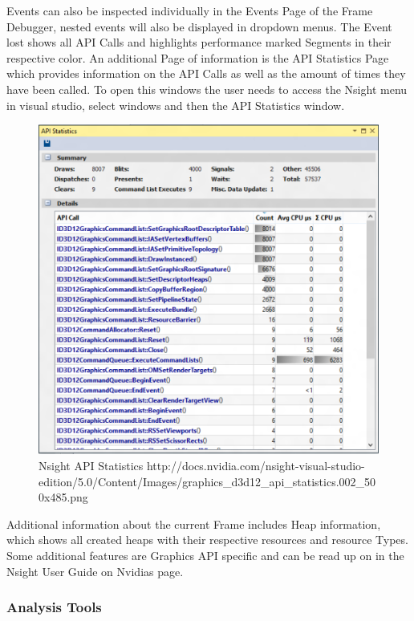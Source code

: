 Events can also be inspected individually in the Events Page of the Frame Debugger, nested events will also be displayed in dropdown menus. The Event lost shows all API Calls and highlights performance marked Segments in their respective color.
An additional Page of information is the API Statistics Page which provides information on the API Calls as well as the amount of times they have been called. To open this windows the user needs to access the Nsight menu in visual studio, select windows and then the API Statistics window.

\begin{figure}[htbp]
\includegraphics[scale = 0.42]{img/Nsight_API_statistics.png}
\caption{Nsight API Statistics http://docs.nvidia.com/nsight-visual-studio-edition/5.0/Content/Images/graphics\_d3d12\_api\_statistics.002\_500x485.png}
\label{fig:Nsight_API_Statistics}
\end{figure}

Additional information about the current Frame includes Heap information, which shows all created heaps with their respective resources and resource Types.
Some additional features are Graphics API specific and can be read up on in the Nsight User Guide on Nvidias page.

\subsubsection {Analysis Tools}

